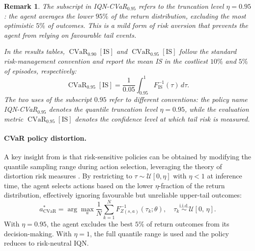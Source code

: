 \documentclass[11pt]{article}
\newtheorem{remark}[theorem]{Remark}
\begin{document}
\begin{remark}\label{rem:cvar_convention}
The subscript in IQN-CVaR$_{0.95}$ refers to the truncation 
level $\eta = 0.95$: the agent averages the lower $95\%$ of 
the return distribution, excluding the most optimistic $5\%$ 
of outcomes. This is a mild form of risk aversion that 
prevents the agent from relying on favourable tail events.

In the results tables, $\operatorname{CVaR}_{0.90}[\mathrm{IS}]$ 
and $\operatorname{CVaR}_{0.95}[\mathrm{IS}]$ follow the 
standard risk-management convention and report the mean IS in 
the costliest $10\%$ and $5\%$ of episodes, respectively:
\begin{equation*}
    \operatorname{CVaR}_{0.95}[\mathrm{IS}] 
    = \frac{1}{0.05} \int_{0.95}^{1} 
    F_{\mathrm{IS}}^{-1}(\tau)\, d\tau.
\end{equation*}
The two uses of the subscript $0.95$ refer to different 
conventions: the policy name IQN-CVaR$_{0.95}$ denotes the 
quantile truncation level $\eta = 0.95$, while the evaluation 
metric $\operatorname{CVaR}_{0.95}[\mathrm{IS}]$ denotes the 
confidence level at which tail risk is measured.
\end{remark}

\paragraph{CVaR policy distortion.}
A key insight from \citet{dabney2018implicit} is that risk-sensitive policies can be obtained by modifying the quantile sampling range during action selection, leveraging the theory of distortion risk measures \citet{wang2000class, majumdar2020should}. By restricting 
to $\tau \sim \mathcal{U}[0, \eta]$ with $\eta < 1$ at 
inference time, the agent selects actions based on the lower 
$\eta$-fraction of the return distribution, effectively 
ignoring favourable but unreliable upper-tail outcomes:
\begin{equation}\label{eq:cvar_action}
    a^*_{\operatorname{CVaR}} = \arg\max_{a} \frac{1}{N} 
    \sum_{k=1}^{N} F_{Z(s,a)}^{-1}(\tau_k;\theta), \quad 
    \tau_k \overset{\text{i.i.d.}}{\sim} 
    \mathcal{U}[0,\, \eta].
\end{equation}
With $\eta = 0.95$, the agent excludes the best $5\%$ of 
return outcomes from its decision-making. With $\eta = 1$, 
the full quantile range is used and the policy reduces to 
risk-neutral IQN.
\end{document}

